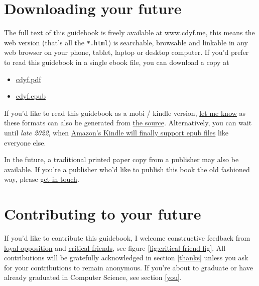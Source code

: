 \documentclass[
]{book}
\providecommand{\tightlist}{%
  \setlength{\itemsep}{0pt}\setlength{\parskip}{0pt}}
\begin{document}
\hypertarget{downloading}{%
\section{Downloading your future}\label{downloading}}

The full text of this guidebook is freely available at \href{https://www.cdyf.me/}{www.cdyf.me}, this means the web version (that's all the \texttt{*.html}) is searchable, browsable and linkable in any web browser on your phone, tablet, laptop or desktop computer. If you'd prefer to read this guidebook in a single ebook file, you can download a copy at

\begin{itemize}
\tightlist
\item
  \href{https://www.cdyf.me/cdyf.pdf}{cdyf.pdf}
\item
  \href{https://www.cdyf.me/cdyf.epub}{cdyf.epub}
\end{itemize}

If you'd like to read this guidebook as a mobi / kindle version, \href{https://personalpages.manchester.ac.uk/staff/duncan.hull/contact}{let me know} as these formats can also be generated from \href{https://github.com/dullhunk/cdyf}{the source}. Alternatively, you can wait until \emph{late 2022}, when \href{https://mashable.com/article/amazon-kindle-epub}{Amazon's Kindle will finally support epub files} like everyone else.

In the future, a traditional printed paper copy from a publisher may also be available. If you're a publisher who'd like to publish this book the old fashioned way, please \href{https://personalpages.manchester.ac.uk/staff/duncan.hull/contact}{get in touch}.

\hypertarget{contributing}{%
\section{Contributing to your future}\label{contributing}}

If you'd like to contribute this guidebook, I welcome constructive feedback from \href{https://en.wikipedia.org/wiki/Loyal_opposition}{loyal opposition} and \href{https://en.wikipedia.org/wiki/Critical_friend}{critical friends}, see figure \ref{fig:critical-friend-fig}. All contributions will be gratefully acknowledged in section \ref{thanks} unless you ask for your contributions to remain anonymous. If you're about to graduate or have already graduated in Computer Science, see section \ref{you}.
\end{document}
